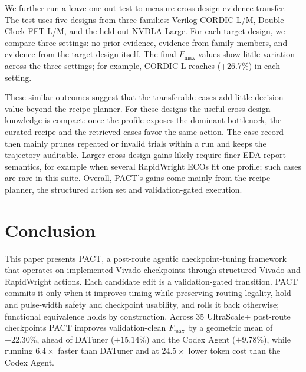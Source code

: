 \documentclass[conference]{IEEEtran}
\newcommand{\rev}[1]{#1}
\begin{document}
We further run a leave-one-out test to measure cross-design evidence transfer. The test uses five designs from three families: Verilog CORDIC-L/M, Double-Clock FFT-L/M, and the held-out NVDLA Large. For each target design, we compare three settings: no prior evidence, evidence from family members, and evidence from the target design itself. The final $F_{\max}$ values show little variation across the three settings; for example, CORDIC-L reaches (+26.7\%) in each setting.

\rev{These similar outcomes suggest that the transferable cases add
little decision value beyond the recipe planner. For these designs the
useful cross-design knowledge is compact: once the profile exposes the
dominant bottleneck, the curated recipe and the retrieved cases favor
the same action. The case record then mainly prunes repeated or invalid
trials within a run and keeps the trajectory auditable. Larger
cross-design gains likely require finer EDA-report semantics, for
example when several RapidWright ECOs fit one profile; such cases are
rare in this suite. Overall, PACT's gains come mainly from the recipe
planner, the structured action set and validation-gated execution.}



\section{Conclusion}
\label{sec:conclusion}

This paper presents PACT, a post-route agentic checkpoint-tuning
framework that operates on
implemented Vivado checkpoints \rev{through} structured
Vivado and RapidWright actions. Each candidate edit is a
validation-gated transition. PACT commits it only when it improves
timing while preserving routing legality, hold and pulse-width safety
and checkpoint usability, and rolls it back otherwise; functional
equivalence holds by construction. Across 35 UltraScale+ post-route checkpoints PACT improves
validation-clean $F_{\max}$ by a geometric mean of $+22.30\%$, ahead of
DATuner ($+15.14\%$) and the Codex Agent ($+9.78\%$), while running
$6.4\times$ faster than DATuner and at $24.5\times$ lower token cost
than the Codex Agent.
\end{document}
